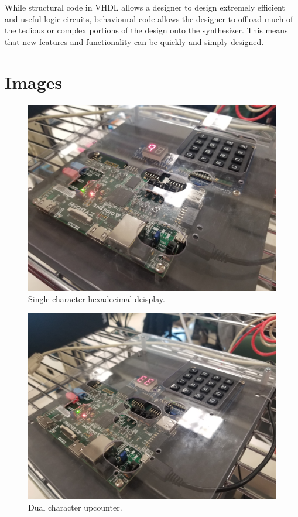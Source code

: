 \documentclass{article}
\begin{document}
While structural code in VHDL allows a designer to design extremely efficient and useful
logic circuits, behavioural code allows the designer to offload much of the tedious or complex
portions of the design onto the synthesizer.
This means that new features and functionality can be quickly and simply designed.

\newpage


\appendix

\section{Images}

    \begin{figure}[H]
        \includegraphics[width=125mm]{display_single.jpg}
        \caption{Single-character hexadecimal deisplay.}
        \label{fig:display_single}
    \end{figure}

    
    \begin{figure}[H]
        \includegraphics[width=125mm]{counter_dual.jpg}
        \caption{Dual character upcounter.}
        \label{fig:counter_dual}
    \end{figure}
\end{document}
